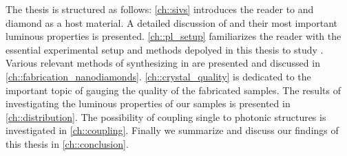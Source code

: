 	The thesis is structured as follows: \autoref{ch::sivs} introduces the reader to \ccs and diamond as a host material. A detailed discussion of \sivs and their most important luminous properties is presented. \autoref{ch::pl_setup} familiarizes the reader with the essential experimental setup and methods depolyed in this thesis to study \sivs. Various relevant methods of synthesizing \sivs in \nds are presented and discussed in \autoref{ch::fabrication_nanodiamonds}. \autoref{ch::crystal_quality} is dedicated to the important topic of gauging the quality of the fabricated samples. The results of investigating the luminous properties of our \siv samples is presented in \autoref{ch::distribution}. The possibility of coupling single \sivs to photonic structures is investigated in \autoref{ch::coupling}. Finally we summarize and discuss our findings of this thesis in \autoref{ch::conclusion}.
